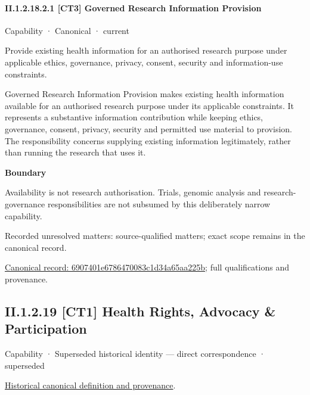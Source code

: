 \paragraph*{II.1.2.18.2.1 [CT3] Governed Research Information Provision}
\label{navigation:II.1.2.18.2.1}

\label{element:6907401e6786470083c1d34a65aa225b}
{\small Capability · Canonical · current}\par

Provide existing health information for an authorised research purpose under applicable ethics, governance, privacy, consent, security and information-use constraints.



Governed Research Information Provision makes existing health information available for an authorised research purpose under its applicable constraints. It represents a substantive information contribution while keeping ethics, governance, consent, privacy, security and permitted use material to provision. The responsibility concerns supplying existing information legitimately, rather than running the research that uses it.



\textbf{Boundary}



Availability is not research authorisation. Trials, genomic analysis and research-governance responsibilities are not subsumed by this deliberately narrow capability.


{\small Recorded unresolved matters: source-qualified matters; exact scope remains in the canonical record.}\par
{\footnotesize \href{../../../../continuum/strategy/capability/6907401e6786470083c1d34a65aa225b.md}{Canonical record: 6907401e6786470083c1d34a65aa225b}; full qualifications and provenance.}\par
\subsection*{II.1.2.19 [CT1] Health Rights, Advocacy \& Participation}
\label{navigation:II.1.2.19}

\label{element:58376e5c53bf4af0a54f99f21ac52666}
{\small Capability · Superseded historical identity — direct correspondence · superseded}\par
\href{../../../../continuum/strategy/capability/58376e5c53bf4af0a54f99f21ac52666.md}{Historical canonical definition and provenance}.\par
